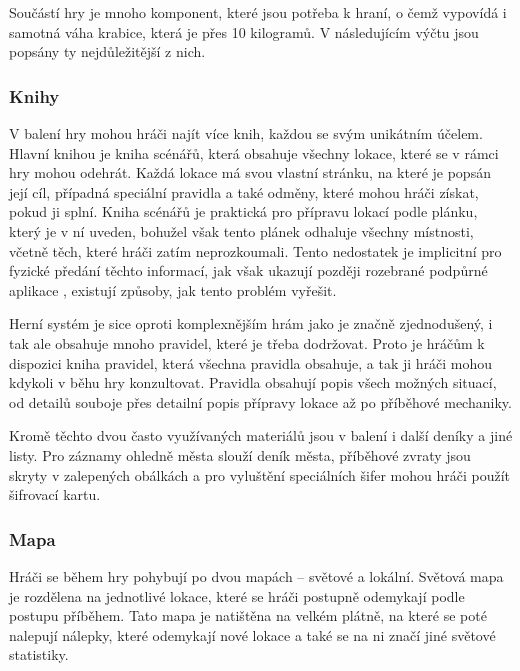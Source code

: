 Součástí hry  je mnoho komponent, které jsou potřeba k hraní, o čemž vypovídá i samotná váha krabice, která je přes 10 kilogramů. V následujícím výčtu jsou popsány ty nejdůležitější z nich.

\subsubsection*{Knihy}
\label{subsubsec:gh_comp_books}

V balení hry mohou hráči najít více knih, každou se svým unikátním účelem. Hlavní knihou je kniha scénářů, která obsahuje všechny lokace, které se v rámci hry mohou odehrát. Každá lokace má svou vlastní stránku, na které je popsán její cíl, případná speciální pravidla a také odměny, které mohou hráči získat, pokud ji splní. Kniha scénářů je praktická pro přípravu lokací podle plánku, který je v ní uveden, bohužel však tento plánek odhaluje všechny místnosti, včetně těch, které hráči zatím neprozkoumali. Tento nedostatek je implicitní pro fyzické předání těchto informací, jak však ukazují později rozebrané podpůrné aplikace , existují způsoby, jak tento problém vyřešit.

Herní systém  je sice oproti komplexnějším hrám jako je \dnd{} značně zjednodušený, i tak ale obsahuje mnoho pravidel, které je třeba dodržovat. Proto je hráčům k dispozici kniha pravidel, která všechna pravidla obsahuje, a tak ji hráči mohou kdykoli v běhu hry konzultovat. Pravidla obsahují popis všech možných situací, od detailů souboje přes detailní popis přípravy lokace až po příběhové mechaniky.

Kromě těchto dvou často využívaných materiálů jsou v balení i další deníky a jiné listy. Pro záznamy ohledně města slouží deník města, příběhové zvraty jsou skryty v zalepených obálkách a pro vyluštění speciálních šifer mohou hráči použít šifrovací kartu.

\subsubsection*{Mapa}
\label{subsubsec:gh_comp_map}

Hráči se během hry pohybují po dvou mapách -- světové a lokální. Světová mapa je rozdělena na jednotlivé lokace, které se hráči postupně odemykají podle postupu příběhem. Tato mapa je natištěna na velkém plátně, na které se poté nalepují nálepky, které odemykají nové lokace a také se na ni značí jiné světové statistiky.

